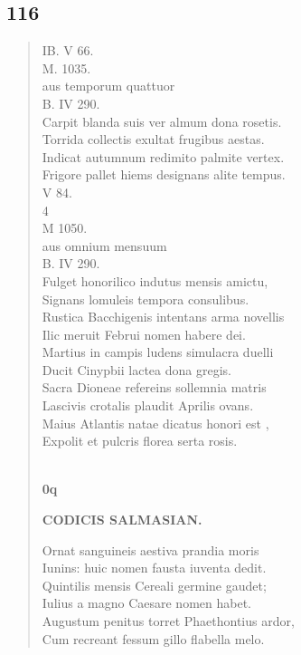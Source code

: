 \documentclass[11pt, a4paper]{report}
\begin{document}
            \subsection*{116}
      \begin{verse}
      IB. V 66. \\ M. 1035. \\ aus temporum quattuor \\ B. IV 290. \\ Carpit blanda suis ver almum dona rosetis. \\ Torrida collectis exultat frugibus aestas. \\ Indicat autumnum redimito palmite vertex. \\ Frigore pallet hiems designans alite tempus. \\ V 84. \\ 4 \\ M 1050. \\ aus omnium mensuum \\ B. IV 290. \\ Fulget honorilico indutus mensis amictu, \\ Signans lomuleis tempora consulibus. \\ Rustica Bacchigenis intentans arma novellis \\ Ilic meruit Februi nomen habere dei. \\ Martius in campis ludens simulacra duelli \\ Ducit Cinypbii lactea dona gregis. \\ Sacra Dioneae refereins sollemnia matris \\ Lascivis crotalis plaudit Aprilis ovans. \\ Maius Atlantis natae dicatus honori  \lbrack est \rbrack , \\ Expolit et pulcris florea serta rosis. \\ 
        ﻿\pagebreak 
    \begin{center} \textbf{0q} \end{center}\begin{center} \textbf{CODICIS SALMASIAN.} \end{center}Ornat sanguineis aestiva prandia moris \\ Iunins: huic nomen fausta iuventa dedit. \\ Quintilis mensis Cereali germine gaudet; \\ Iulius a magno Caesare nomen habet. \\ Augustum penitus torret Phaethontius ardor, \\ Cum recreant fessum gillo flabella melo. \\ 
      \end{verse}
  
\end{document}
